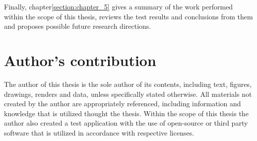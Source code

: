 Finally, chapter\ref{section:chapter_5} gives a summary of the work performed within the scope of this thesis, reviews the test results and conclusions from them and proposes possible future research directions.

\section{Author's contribution}
The author of this thesis is the sole author of its contents, including text, figures, drawings, renders and data, unless specifically stated otherwise. All materials not created by the author are appropriately referenced, including information and knowledge that is utilized thought the thesis. Within the scope of this thesis the author also created a test application with the use of open-source or third party software that is utilized in accordance with respective licenses. 


